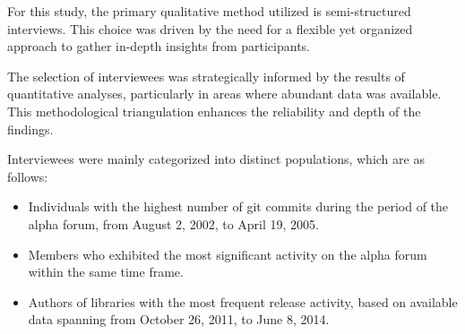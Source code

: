       
  
  For this study, the primary qualitative method utilized is semi-structured interviews. This choice was driven by the need for a flexible yet organized approach to gather in-depth insights from participants.
  
  The selection of interviewees was strategically informed by the results of quantitative analyses, particularly in areas where abundant data was available. This methodological triangulation enhances the reliability and depth of the findings.
  
  Interviewees were mainly categorized into distinct populations, which are as follows:
  
  \begin{itemize}
      \item Individuals with the highest number of git commits during the period of the alpha forum, from August 2, 2002, to April 19, 2005.
      \item Members who exhibited the most significant activity on the alpha forum within the same time frame.
      \item Authors of libraries with the most frequent release activity, based on available data spanning from October 26, 2011, to June 8, 2014.
  \end{itemize}

